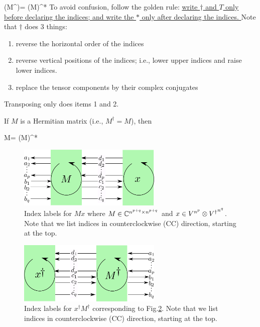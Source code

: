 \beq
(M^\dagger)= (M)^*
\eeq
To avoid confusion,
follow the golden rule: \ul{write 
$\dagger$ and $T$ only before
declaring the indices; and write 
the $*$ only after declaring the
indices.
}
Note that $\dagger$
does 3 things: 
\begin{enumerate} \item reverse the horizontal order of the indices \item
reverse vertical positions
of the indices; i.e., 
lower upper indices and raise lower indices.

\item replace the tensor components
by their complex conjugates
\end{enumerate}
Transposing only does
items 1 and 2.


If $M$ is a Hermitian matrix (i.e., $M^\dagger =M$), then

\beq
M= (M)^*
\eeq



\begin{figure}[h!]
\centering
\includegraphics[width=2.7in]
{conventions/index-labels-Mx.png}
\caption{Index labels for $Mx$
where $M
\in { \mathbb{C}}^{n^{p+q}\times n^{p+q}}$ and
$x\in V^{n^p}\otimes {V^\dagger}^{n^q}$.
Note that we  list indices in counterclockwise (CC) direction, 
starting at the top.}
\label{fig-index-labels-Mx}
\end{figure}

\begin{figure}[h!]
\centering
\includegraphics[width=2.7in]
{conventions/index-labels-hermitian.png}
\caption{Index labels for $x^\dagger M^\dagger$
corresponding to Fig.\ref{fig-index-labels-hermitian}.
Note that we  list indices in counterclockwise (CC) direction, 
starting at the top. }
\label{fig-index-labels-hermitian}
\end{figure}


